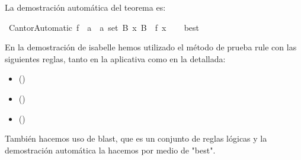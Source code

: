 \begin{isabellebody}
\isadelimproof
%
\endisadelimproof
%
\isadelimdocument
%
\endisadelimdocument
%
\isatagdocument
%
\isamarkuptrue%
%
\endisatagdocument
{\isafolddocument}%
%
\isadelimdocument
%
\endisadelimdocument
%
\begin{isamarkuptext}%
La demostración automática del teorema es:%
\end{isamarkuptext}\isamarkuptrue%
\isamarkupfalse%
\ CantorAutomatic{\isacharcolon}\ {\isachardoublequoteopen}{\isasymnexists}f\ {\isacharcolon}{\isacharcolon}\ {\isacharprime}a\ {\isasymRightarrow}\ {\isacharprime}a\ set{\isachardot}\ {\isasymforall}B{\isachardot}\ {\isasymexists}x{\isachardot}\ B\ {\isacharequal}\ f\ x{\isachardoublequoteclose}\isanewline
%
\isadelimproof
\ \ %
\endisadelimproof
%
\isatagproof
{}\isamarkupfalse%
\ best%
\endisatagproof
{\isafoldproof}%
%
\isadelimproof
%
\endisadelimproof
%
\begin{isamarkuptext}%
En la demostración de isabelle hemos utilizado el método de prueba
rule con las siguientes reglas, tanto en la aplicativa como en la
 detallada:
 \begin{itemize}
  \item[]  \hfill ()
  \end{itemize}
 \begin{itemize}
  \item[]  \hfill ()
  \end{itemize}
 \begin{itemize}
  \item[]  \hfill ()
  \end{itemize}
También hacemos uso de blast, que es un conjunto de reglas lógicas y 
 la demostración automática la hacemos por medio de "best".%
\end{isamarkuptext}\isamarkuptrue%
%
\isadelimtheory
%
\endisadelimtheory
%
\isatagtheory
%
\endisatagtheory
{\isafoldtheory}%
%
\isadelimtheory
%
\endisadelimtheory
%
\end{isabellebody}%
\endinput

